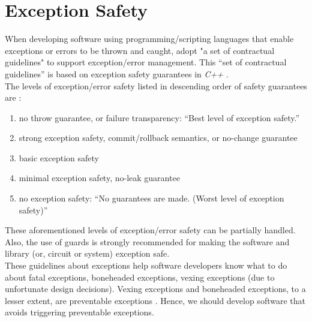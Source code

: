 \documentclass[letter,12pt]{article}
\begin{document}
\section{Exception Safety}
\label{sec:ExceptionSafety}

When developing software using programming/scripting languages that enable exceptions or errors to be thrown and caught, adopt "a set of contractual guidelines" \cite{WikipediaContributors2016f} to support exception/error management. This ``set of contractual guidelines'' is based on exception safety guarantees in {\it C++} \cite{Abrahams1998,Abrahams2001,WikipediaContributors2016f} \cite[Subsection \S4.4 on ``Writing exception safe code'']{WikibooksContributors2016}. \\


The levels of exception/error safety listed in descending order of safety guarantees are \cite{Abrahams1998,Abrahams2001,WikibooksContributors2016,WikipediaContributors2016f}: \vspace{-0.3cm}
\begin{enumerate} \itemsep -4pt
\item no throw guarantee, or failure transparency: ``Best level of exception safety.''
\item strong exception safety, commit/rollback semantics, or no-change guarantee
\item basic exception safety
\item minimal exception safety, no-leak guarantee
\item no exception safety: ``No guarantees are made. (Worst level of exception safety)''
\end{enumerate}

These aforementioned levels of exception/error safety can be partially handled. Also, the use of guards is strongly recommended for making the software and library (or, circuit or system) exception safe. \\

These guidelines about exceptions help software developers know what to do about fatal exceptions, boneheaded exceptions, vexing exceptions (due to unfortunate design decisions). Vexing exceptions and boneheaded exceptions, to a lesser extent, are preventable exceptions \cite{Lippert2008}. Hence, we should develop software that avoids triggering preventable exceptions. \\
\end{document}
